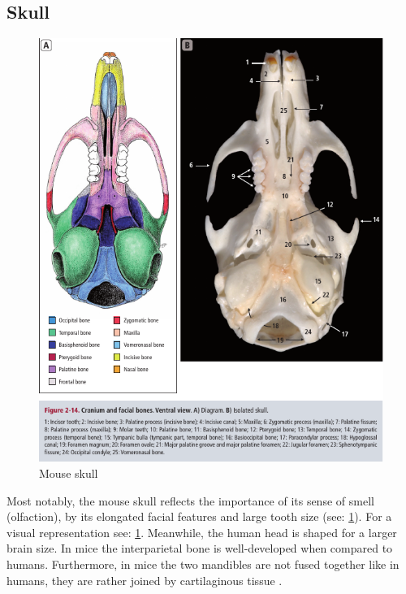 \subsection{Skull}
\label{s:b-mouse-skull}
\begin{figure}[h]
	\centerline{
		\includegraphics[scale=0.7]{images/mouseSkull.png}}
	\caption{Mouse skull \cite{ruberteBridgingMouseHuman2023}}\label{fig:mouseSkull}
\end{figure}

\noindent
Most notably, the mouse skull reflects the importance of its sense of smell (olfaction),
by its elongated facial features and large tooth size (see: \cref{fig:mouseSkull}).
For a visual representation see: \cref{fig:mouseSkull}.
Meanwhile, the human head is shaped for a larger brain size.
In mice the interparietal bone is well-developed when compared to humans.
Furthermore, in mice the two mandibles are not fused together like in humans,
they are rather joined by cartilaginous tissue \cite{jeromeSkeletalSystem2018,halleOpenAnatomyBrowser2017,platzerTaschenatlasAnatomieBd2013}.

